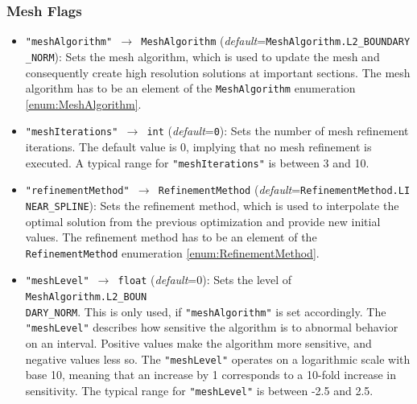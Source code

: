 \documentclass[12pt]{article}
\begin{document}
\subsubsection{Mesh Flags}
\label{c:meshflags}

\begin{mdframed}[backgroundcolor=gray!10, roundcorner=10pt,
	linewidth=1pt]
	
	
\begin{itemize}
		
	\label{flag:MeshAlgorithm}
	\item \texttt{"meshAlgorithm" $\rightarrow$ MeshAlgorithm} (\emph{default}=\texttt{MeshAlgorithm.L2\_BOUNDARY} \texttt{\_NORM}): Sets the mesh algorithm, which is used to update the mesh and consequently create high resolution solutions at important sections. The mesh algorithm has to be an element of the \texttt{MeshAlgorithm} enumeration \ref{enum:MeshAlgorithm}.
	
	\label{flag:meshIterations}
	\item \texttt{"meshIterations" $\rightarrow$ int} (\emph{default}=\texttt{0}): Sets the number of mesh refinement iterations. The default value is 0, implying that no mesh refinement is executed. 
	A typical range for \texttt{"meshIterations"} is between 3 and 10.
	
	\label{flag:RefinementMethod}
	\item \texttt{"refinementMethod" $\rightarrow$ RefinementMethod} (\emph{default}=\texttt{RefinementMethod.LI} \texttt{NEAR\_SPLINE}): Sets the refinement method, which is used to interpolate the optimal solution from the previous optimization and provide new initial values. The refinement method has to be an element of the \texttt{RefinementMethod} enumeration \ref{enum:RefinementMethod}.
	
	\label{flag:meshLevel}
	\item \texttt{"meshLevel" $\rightarrow$ float} (\emph{default}=0): Sets the level of \texttt{MeshAlgorithm.L2\_BOUN\\DARY\_NORM}. This is only used, if \texttt{"meshAlgorithm"} is set accordingly. The \texttt{"meshLevel"} describes how sensitive the algorithm is to abnormal behavior on an interval. Positive values make the algorithm more sensitive, and negative values less so. The \texttt{"meshLevel"} operates on a logarithmic scale with base 10, meaning that an increase by 1 corresponds to a 10-fold increase in sensitivity. The typical range for \texttt{"meshLevel"} is between -2.5 and 2.5.
	

\end{itemize}
\end{mdframed}
\end{document}
